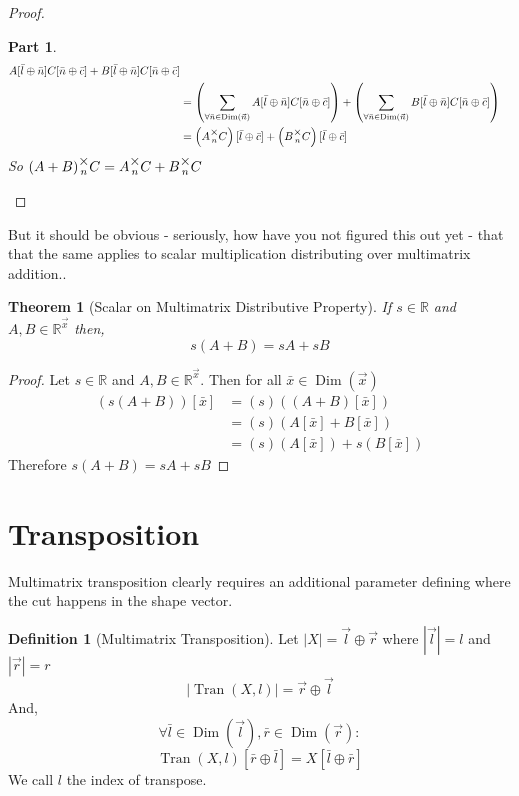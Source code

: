 \documentclass[12pt]{book}
\theoremstyle{definition}
\newtheorem{definition}{Definition}[chapter]
\theoremstyle{plain}
\newtheorem{theorem}{Theorem}[chapter]
\theoremstyle{ppart}
\newtheorem{ppart}{Part}
\theoremstyle{case}
\theoremstyle{solution}
\DeclareMathOperator{\Dim}{Dim}
\DeclareMathOperator{\Tran}{Tran}
\newcommand{\mmult}[1]{\text{\raisebox{1ex}{$\underset{#1}{\times}$}}}
\begin{document}
\begin{landscape}
\begin{proof}
\begin{ppart}
\begin{align*}
    A[\bar{l} \oplus \bar{n}]C[\bar{n} \oplus \bar{c}]
    +B[\bar{l} \oplus \bar{n}]C[\bar{n} \oplus \bar{c}] \\
 &= \left(\sum_{\forall \bar{n} \in \Dim(\vec{n})}
    A[\bar{l} \oplus \bar{n}]C[\bar{n} \oplus \bar{c}]\right)
    +
    \left(\sum_{\forall \bar{n} \in \Dim(\vec{n})}
    B[\bar{l} \oplus \bar{n}]C[\bar{n} \oplus \bar{c}]\right) \\
 &= \left(A \mmult{n} C\right)[\bar{l} \oplus \bar{c}]
    +\left(B \mmult{n} C\right)[\bar{l} \oplus \bar{c}]
\end{align*}
So $(A+B) \mmult{n} C = A \mmult{n} C + B \mmult{n} C$ 
\end{ppart}
\end{proof}
\end{landscape}

But it should be obvious - seriously, how have you not figured this out yet -
that that the same applies to scalar  multiplication distributing over multimatrix
addition..
\begin{theorem}[Scalar on Multimatrix Distributive Property]
If $s \in \mathbb{R}$ and $A, B \in \mathbb{R}^{\vec{x}}$ then,
\[ s(A + B) = sA + sB \]
\end{theorem}
\begin{proof}
Let $s \in \mathbb{R}$ and $A, B \in \mathbb{R}^{\vec{x}}$.
Then for all $\bar{x} \in \Dim(\vec{x})$
\begin{align*}
(s(A+B))[\bar{x}]
&= (s)((A+B)[\bar{x}]) \\
&= (s)(A[\bar{x}] + B[\bar{x}]) \\
&= (s)(A[\bar{x}]) + s(B[\bar{x}])
\end{align*}
Therefore $s(A+B) = sA + sB$
\end{proof}

\section{Transposition}

Multimatrix transposition clearly requires an additional parameter defining where
the cut happens in the shape vector.

\begin{definition}[Multimatrix Transposition]
\label{tran_def}
Let $|X| = \vec{l} \oplus \vec{r}$ where $|\vec{l}| = l$ and $|\vec{r}| = r$
\[ |\Tran(X, l)| = \vec{r} \oplus \vec{l} \]
And,
\[ \forall \bar{l} \in \Dim(\vec{l}), \bar{r} \in \Dim(\vec{r}) : \]
\[ \Tran(X, l)[\bar{r} \oplus \bar{l}] = X[\bar{l} \oplus \bar{r}] \]
We call $l$ the index of transpose.
\end{definition}
\end{document}
